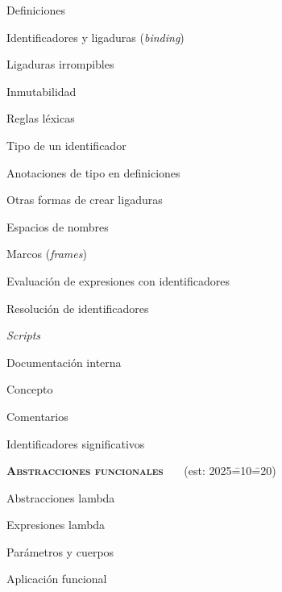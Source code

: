 \begin{longenum}
\begin{longenum}
\begin{longenum}
        \end{longenum}
        \item Definiciones
        \begin{longenum}
            \item Identificadores y ligaduras (\textit{binding})
            \begin{longenum}
                \item Ligaduras irrompibles
                \item Inmutabilidad
                \item Reglas léxicas
                \item Tipo de un identificador
                \item Anotaciones de tipo en definiciones
                \item Otras formas de crear ligaduras
            \end{longenum}
            \item Espacios de nombres
            \item Marcos (\textit{frames})
            \item Evaluación de expresiones con identificadores
            \begin{longenum}
                \item Resolución de identificadores
            \end{longenum}
        \end{longenum}
        \item \textit{Scripts}
        \item Documentación interna
        \begin{longenum}
            \item Concepto
            \item Comentarios
            \item Identificadores significativos
        \end{longenum}
    \end{longenum}
    \item \textbf{\textsc{Abstracciones funcionales}} \ \ \ (est: 2025\==10\==20)
    \begin{longenum}
        \item Abstracciones lambda
        \begin{longenum}
            \item Expresiones lambda
            \item Parámetros y cuerpos
            \item Aplicación funcional

\end{longenum}
\end{longenum}
\end{longenum}

